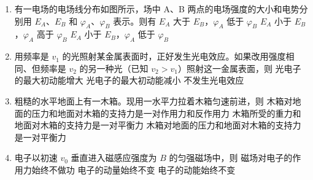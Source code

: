 \documentclass[\gkver]{gaokaozhenti}
\begin{document}
\begin{enumerate}

\item
有一电场的电场线分布如图所示，场中 A、B 两点的电场强度的大小和电势分别用 $E_{A}$、$E_{B}$ 和 $\varphi_{A}$、$\varphi_{B}$ 表示。则有
\onepicture[align=right, w=4.5cm]{}
{$E_{A}$ 大于 $E_{B}$，$\varphi_{A}$ 低于 $\varphi_{B}$}
{$E_{A}$ 小于 $E_{B}$，$\varphi_{A}$ 高于 $\varphi_{B}$}
{$E_{A}$ 小于 $E_{B}$，$\varphi_{A}$ 低于 $\varphi_{B}$}


\item
用频率是 $v_{1}$ 的光照射某金属表面时，正好发生光电效应。如果改用强度相同、但频率是 $v_{2}$ 的另一种光（已知 $v_{2} > v_{1}$）照射这一金属表面，则
{光电子的最大初动能增大}
{光电子的最大初动能减小}
{不发生光电效应}


\item
粗糙的水平地面上有一木箱。现用一水平力拉着木箱匀速前进，则
{木箱对地面的压力和地面对木箱的支持力是一对作用力和反作用力}
{木箱所受的重力和地面对木箱的支持力是一对平衡力}
{木箱对地面的压力和地面对木箱的支持力是一对平衡力}


\item
电子以初速 $v_{0}$ 垂直进入磁感应强度为 $B$ 的匀强磁场中，则
{磁场对电子的作用力始终不做功}
{电子的动量始终不变}
{电子的动能始终不变}


\end{enumerate}
\end{document}
